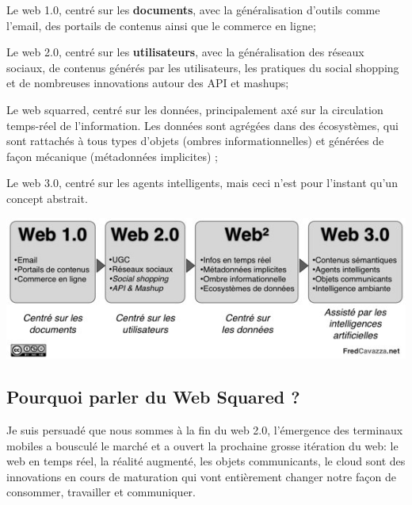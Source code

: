 \begin{list}{•}{}

\item

Le web 1.0, centré sur les \textbf{documents}, avec la généralisation d'outils comme l'email, des portails de contenus ainsi que le commerce en ligne;

\item

Le web 2.0, centré sur les \textbf{utilisateurs}, avec la généralisation des réseaux sociaux, de contenus générés par les utilisateurs, les pratiques du social shopping et de nombreuses innovations autour des API et mashups;

\item

Le web squarred, centré sur les données, principalement axé sur la circulation temps-réel de l'information. Les données sont agrégées dans des écosystèmes, qui sont rattachés à tous types d’objets (ombres informationnelles) et générées de façon mécanique (métadonnées implicites) ;

\item

Le web 3.0, centré sur les agents intelligents, mais ceci n'est pour l'instant qu'un concept abstrait.

\end{list}

\begin{center}

\includegraphics[scale=0.8]{img/Web1-3.jpg}

\label{Les grandes étapes d'évolutions du web}

\end{center}

\subsection{Pourquoi parler du Web Squared ?}

Je suis persuadé que nous sommes à la fin du web 2.0, l'émergence des terminaux mobiles a bousculé le marché et a ouvert la prochaine grosse itération du web: le web en temps réel, la réalité augmenté, les objets communicants, le cloud sont des innovations en cours de maturation qui vont entièrement changer notre façon de consommer, travailler et communiquer.

